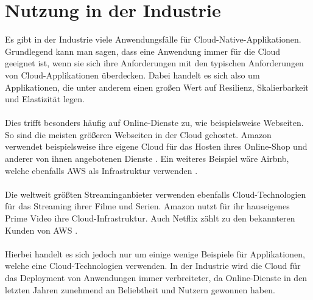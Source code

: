 \section{Nutzung in der Industrie}
Es gibt in der Industrie viele Anwendungsfälle für Cloud-Native-Applikationen. Grundlegend kann man sagen, dass eine Anwendung immer für die Cloud geeignet ist, wenn sie sich ihre Anforderungen mit den typischen Anforderungen von Cloud-Applikationen überdecken. Dabei handelt es sich also um Applikationen, die unter anderem einen großen Wert auf Resilienz, Skalierbarkeit und Elastizität legen.
\\\\
Dies trifft besonders häufig auf Online-Dienste zu, wie beispielsweise Webseiten. So sind die meisten größeren Webseiten in der Cloud gehostet. Amazon verwendet beispielsweise ihre eigene Cloud für das Hosten ihres Online-Shop und anderer von ihnen angebotenen Dienste \cite{noauthor_amazon_2021}. Ein weiteres Beispiel wäre Airbnb, welche ebenfalls AWS als Infrastruktur verwenden \cite{noauthor_airbnb_2021}.
\\\\
Die weltweit größten Streaminganbieter verwenden ebenfalls Cloud-Technologien für das Streaming ihrer Filme und Serien. Amazon nutzt für ihr hauseigenes Prime Video ihre Cloud-Infrastruktur. Auch Netflix zählt zu den bekannteren Kunden von AWS \cite{noauthor_netflix_2021}.
\\\\
Hierbei handelt es sich jedoch nur um einige wenige Beispiele für Applikationen, welche eine Cloud-Technologien verwenden. In der Industrie wird die Cloud für das Deployment von Anwendungen immer verbreiteter, da Online-Dienste in den letzten Jahren zunehmend an Beliebtheit und Nutzern gewonnen haben.

